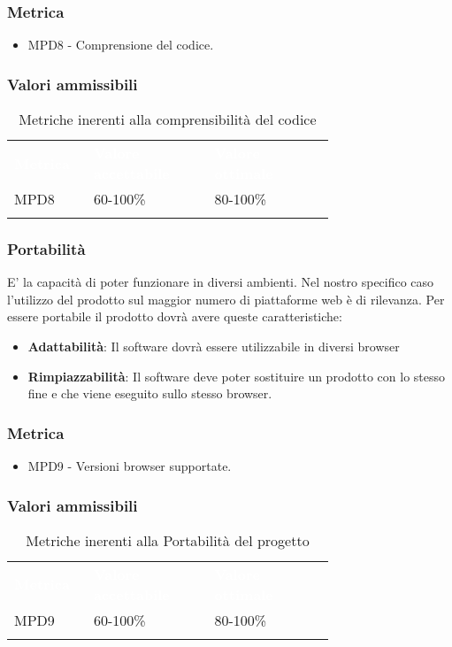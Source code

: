 \subsubsection{Metrica}
\begin{itemize}
    \item MPD8 - Comprensione del codice.
\end{itemize}
\subsubsection{Valori ammissibili}
\renewcommand{\arraystretch}{1.5}
\begin{longtable}{p{0.12\linewidth}p{0.30\linewidth}p{0.30\linewidth}}
	\rowcolor[RGB]{33, 73, 50}
	\textcolor{white}{\textbf{Metrica}} & \textcolor{white}{\textbf{Valore accettabile}} & \textcolor{white}{\textbf{Valore ottimale}}\\
    \rowcolor[RGB]{233, 245, 206}
    MPD8 & 60-100\% & 80-100\%\\ 
    \caption{Metriche inerenti alla comprensibilità del codice}
\end{longtable}	
\subsubsection{Portabilità}
E' la capacità di poter funzionare in diversi ambienti. Nel nostro specifico caso l'utilizzo del
prodotto sul maggior numero di piattaforme web è di rilevanza.
Per essere portabile il prodotto dovrà avere queste caratteristiche:
\begin{itemize}
    \item \textbf{Adattabilità}: Il software dovrà essere utilizzabile in diversi browser
    \item \textbf{Rimpiazzabilità}: Il software deve poter sostituire un prodotto con lo stesso fine e che viene eseguito sullo stesso browser.
\end{itemize}
\subsubsection{Metrica}
\begin{itemize}
    \item MPD9 - Versioni browser supportate.
\end{itemize}
\subsubsection{Valori ammissibili}
\renewcommand{\arraystretch}{1.5}
\begin{longtable}{p{0.12\linewidth}p{0.30\linewidth}p{0.30\linewidth}}
	\rowcolor[RGB]{33, 73, 50}
	\textcolor{white}{\textbf{Metrica}} & \textcolor{white}{\textbf{Valore accettabile}} & \textcolor{white}{\textbf{Valore ottimale}}\\
    \rowcolor[RGB]{233, 245, 206}
    MPD9 & 60-100\% & 80-100\%\\ 
    \caption{Metriche inerenti alla Portabilità del progetto}
\end{longtable}	
\newpage
